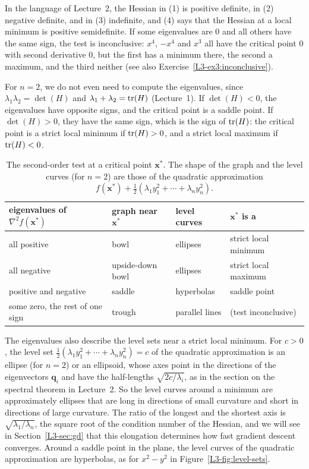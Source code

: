 In the language of Lecture~2, the Hessian in (1) is positive definite, in (2) negative definite, and in (3) indefinite, and (4) says that the Hessian at a local minimum is positive semidefinite. If some eigenvalues are $0$ and all others have the same sign, the test is inconclusive: $x^4$, $-x^4$ and $x^3$ all have the critical point $0$ with second derivative $0$, but the first has a minimum there, the second a maximum, and the third neither (see also Exercise~\ref{L3-ex3:inconclusive}).

For $n = 2$, we do not even need to compute the eigenvalues, since $\lambda_1\lambda_2 = \det(H)$ and $\lambda_1 + \lambda_2 = \operatorname{tr}(H)$ (Lecture~1). If $\det(H) < 0$, the eigenvalues have opposite signs, and the critical point is a saddle point. If $\det(H) > 0$, they have the same sign, which is the sign of $\operatorname{tr}(H)$: the critical point is a strict local minimum if $\operatorname{tr}(H) > 0$, and a strict local maximum if $\operatorname{tr}(H) < 0$.

\begin{table}[ht]
    \centering
    \renewcommand{\arraystretch}{1.3}
    \begin{tabular}{llll}
        \hline
        eigenvalues of $\nabla^2 f(\mathbf{x}^*)$ & graph near $\mathbf{x}^*$ & level curves & $\mathbf{x}^*$ is a \\
        \hline
        all positive & bowl & ellipses & strict local minimum \\
        all negative & upside-down bowl & ellipses & strict local maximum \\
        positive and negative & saddle & hyperbolas & saddle point \\
        some zero, the rest of one sign & trough & parallel lines & (test inconclusive) \\
        \hline
    \end{tabular}
    \caption{The second-order test at a critical point $\mathbf{x}^*$. The shape of the graph and the level curves (for $n = 2$) are those of the quadratic approximation $f(\mathbf{x}^*) + \frac{1}{2}(\lambda_1 y_1^2 + \cdots + \lambda_n y_n^2)$.}
    \label{L3-tab:second-order}
\end{table}

The eigenvalues also describe the level sets near a strict local minimum. For $c > 0$, the level set $\frac{1}{2}(\lambda_1 y_1^2 + \cdots + \lambda_n y_n^2) = c$ of the quadratic approximation is an ellipse (for $n = 2$) or an ellipsoid, whose axes point in the directions of the eigenvectors $\mathbf{q}_i$ and have the half-lengths $\sqrt{2c/\lambda_i}$, as in the section on the spectral theorem in Lecture~2. So the level curves around a minimum are approximately ellipses that are long in directions of small curvature and short in directions of large curvature. The ratio of the longest and the shortest axis is $\sqrt{\lambda_1/\lambda_n}$, the square root of the condition number of the Hessian, and we will see in Section~\ref{L3-sec:gd} that this elongation determines how fast gradient descent converges. Around a saddle point in the plane, the level curves of the quadratic approximation are hyperbolas, as for $x^2 - y^2$ in Figure~\ref{L3-fig:level-sets}.

